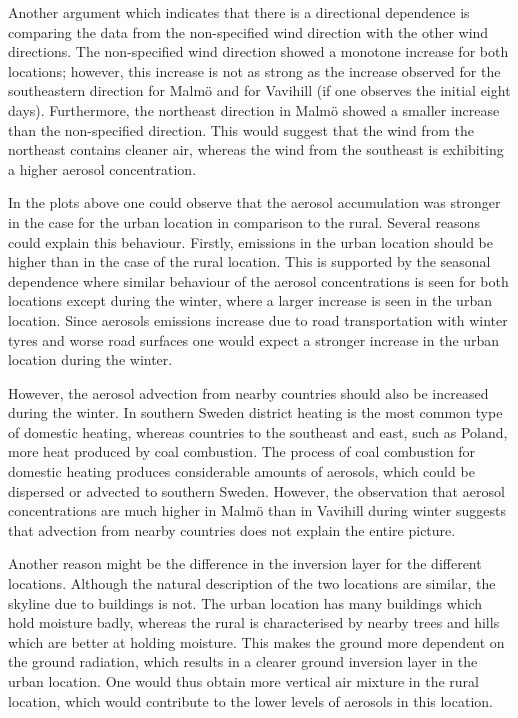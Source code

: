 Another argument which indicates that there is a directional dependence is comparing the data from the non-specified wind direction with the other wind directions. The non-specified wind direction showed a monotone increase for both locations; however, this increase is not as strong as the increase observed for the southeastern direction for Malmö and for Vavihill (if one observes the initial eight days). Furthermore, the northeast direction in Malmö showed a smaller increase than the non-specified direction. This would suggest that the wind from the northeast contains cleaner air, whereas the wind from the southeast is exhibiting a higher aerosol concentration. 

In the plots above one could observe that the aerosol accumulation was stronger in the case for the urban location in comparison to the rural. Several reasons could explain this behaviour. Firstly, emissions in the urban location should be higher than in the case of the rural location. This is supported by the seasonal dependence where similar behaviour of the aerosol concentrations is seen for both locations except during the winter, where a larger increase is seen in the urban location. Since aerosols emissions increase due to road transportation with winter tyres and worse road surfaces one would expect a stronger increase in the urban location during the winter. 

However, the aerosol advection from nearby countries should also be increased during the winter. In southern Sweden district heating is the most common type of domestic heating, whereas countries to the southeast and east, such as Poland, more heat produced by coal combustion. The process of coal combustion for domestic heating produces considerable amounts of aerosols, which could be dispersed or advected to southern Sweden. However, the observation that aerosol concentrations are much higher in Malmö than in Vavihill during winter suggests that advection from nearby countries does not explain the entire picture.

Another reason might be the difference in the inversion layer for the different locations. Although the natural description of the two locations are similar, the skyline due to buildings is not. The urban location has many buildings which hold moisture badly, whereas the rural is characterised by nearby trees and hills which are better at holding moisture. This makes the ground more dependent on the ground radiation, which results in a clearer ground inversion layer in the urban location. One would thus obtain more vertical air mixture in the rural location, which would contribute to the lower levels of aerosols in this location. 

